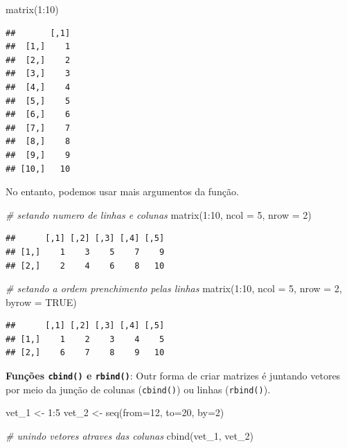 \documentclass[
]{book}
\newenvironment{Shaded}{\begin{snugshade}}{\end{snugshade}}
\newcommand{\AttributeTok}[1]{\textcolor[rgb]{0.77,0.63,0.00}{#1}}
\newcommand{\CommentTok}[1]{\textcolor[rgb]{0.56,0.35,0.01}{\textit{#1}}}
\newcommand{\ConstantTok}[1]{\textcolor[rgb]{0.00,0.00,0.00}{#1}}
\newcommand{\DecValTok}[1]{\textcolor[rgb]{0.00,0.00,0.81}{#1}}
\newcommand{\FunctionTok}[1]{\textcolor[rgb]{0.00,0.00,0.00}{#1}}
\newcommand{\NormalTok}[1]{#1}
\newcommand{\OtherTok}[1]{\textcolor[rgb]{0.56,0.35,0.01}{#1}}
\newcommand{\SpecialCharTok}[1]{\textcolor[rgb]{0.00,0.00,0.00}{#1}}
\begin{document}
\begin{Shaded}
\begin{Highlighting}[]
\FunctionTok{matrix}\NormalTok{(}\DecValTok{1}\SpecialCharTok{:}\DecValTok{10}\NormalTok{)}
\end{Highlighting}
\end{Shaded}

\begin{verbatim}
##       [,1]
##  [1,]    1
##  [2,]    2
##  [3,]    3
##  [4,]    4
##  [5,]    5
##  [6,]    6
##  [7,]    7
##  [8,]    8
##  [9,]    9
## [10,]   10
\end{verbatim}

No entanto, podemos usar mais argumentos da função.

\begin{Shaded}
\begin{Highlighting}[]
\CommentTok{\# setando numero de linhas e colunas}
\FunctionTok{matrix}\NormalTok{(}\DecValTok{1}\SpecialCharTok{:}\DecValTok{10}\NormalTok{, }\AttributeTok{ncol =} \DecValTok{5}\NormalTok{, }\AttributeTok{nrow =} \DecValTok{2}\NormalTok{)}
\end{Highlighting}
\end{Shaded}

\begin{verbatim}
##      [,1] [,2] [,3] [,4] [,5]
## [1,]    1    3    5    7    9
## [2,]    2    4    6    8   10
\end{verbatim}

\begin{Shaded}
\begin{Highlighting}[]
\CommentTok{\# setando a ordem prenchimento pelas linhas}
\FunctionTok{matrix}\NormalTok{(}\DecValTok{1}\SpecialCharTok{:}\DecValTok{10}\NormalTok{, }\AttributeTok{ncol =} \DecValTok{5}\NormalTok{, }\AttributeTok{nrow =} \DecValTok{2}\NormalTok{, }\AttributeTok{byrow =} \ConstantTok{TRUE}\NormalTok{)}
\end{Highlighting}
\end{Shaded}

\begin{verbatim}
##      [,1] [,2] [,3] [,4] [,5]
## [1,]    1    2    3    4    5
## [2,]    6    7    8    9   10
\end{verbatim}

\textbf{Funções \texttt{cbind()} e \texttt{rbind()}}: Outr forma de criar matrizes é juntando vetores por meio da junção de colunas (\texttt{cbind()}) ou linhas (\texttt{rbind()}).

\begin{Shaded}
\begin{Highlighting}[]
\NormalTok{vet\_1 }\OtherTok{\textless{}{-}} \DecValTok{1}\SpecialCharTok{:}\DecValTok{5}
\NormalTok{vet\_2 }\OtherTok{\textless{}{-}} \FunctionTok{seq}\NormalTok{(}\AttributeTok{from=}\DecValTok{12}\NormalTok{, }\AttributeTok{to=}\DecValTok{20}\NormalTok{, }\AttributeTok{by=}\DecValTok{2}\NormalTok{)}

\CommentTok{\# unindo vetores atraves das colunas}
\FunctionTok{cbind}\NormalTok{(vet\_1, vet\_2) }
\end{Highlighting}
\end{Shaded}
\end{document}
